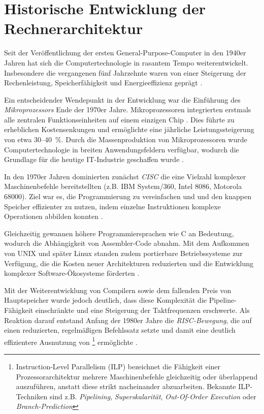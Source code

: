 \section{Historische Entwicklung der Rechnerarchitektur}

Seit der Veröffentlichung der ersten General-Purpose-Computer in den 1940er Jahren hat sich die Computertechnologie in rasantem Tempo weiterentwickelt. Insbesondere die vergangenen fünf Jahrzehnte waren von einer Steigerung der Rechenleistung, Speicherfähigkeit und Energieeffizienz geprägt \parencite[S.~2]{hennessy_computer_2011}.

Ein entscheidender Wendepunkt in der Entwicklung war die Einführung des \textit{Mikroprozessors} Ende der 1970er Jahre. Mikroprozessoren integrierten erstmals alle zentralen Funktionseinheiten auf einem einzigen Chip \parencite[S.~9]{dumas_ii_computer_2006}. Dies führte zu erheblichen Kostensenkungen und ermöglichte eine jährliche Leistungssteigerung von etwa 30–40~\%. Durch die Massenproduktion von Mikroprozessoren wurde Computertechnologie in breiten Anwendungsfeldern verfügbar, wodurch die Grundlage für die heutige IT-Industrie geschaffen wurde \parencites[S.~2]{hennessy_computer_2011}[S.~11]{dumas_ii_computer_2006}.

In den 1970er Jahren dominierten zunächst \textit{\ac{CISC}} die eine Vielzahl komplexer Maschinenbefehle bereitstellten (z.B. IBM System/360, Intel 8086, Motorola 68000). Ziel war es, die Programmierung zu vereinfachen und und den knappen Speicher effizienter zu nutzen, indem einzelne Instruktionen komplexe Operationen abbilden konnten \parencite[S.~12]{dumas_ii_computer_2006}.

Gleichzeitig gewannen höhere Programmiersprachen wie C an Bedeutung, wodurch die Abhängigkeit von Assembler-Code abnahm. Mit dem Aufkommen von UNIX und später Linux standen zudem portierbare Betriebssysteme zur Verfügung, die die Kosten neuer Architekturen reduzierten und die Entwicklung komplexer Software-Ökosysteme förderten \parencites[S.~2]{hennessy_computer_2011}[S.~12]{dumas_ii_computer_2006}.

Mit der Weiterentwicklung von Compilern sowie dem fallenden Preis von Hauptspeicher wurde jedoch deutlich, dass diese Komplexität die Pipeline-Fähigkeit einschränkte und eine Steigerung der Taktfrequenzen erschwerte. Als Reaktion darauf entstand Anfang der 1980er Jahre die \textit{\ac{RISC}-Bewegung}, die auf einen reduzierten, regelmäßigen Befehlssatz setzte und damit eine deutlich effizientere Ausnutzung von \footnote{Instruction-Level Parallelism (ILP) bezeichnet die Fähigkeit einer Prozessorarchitektur mehrere Maschinenbefehle gleichzeitig oder überlappend auszuführen, anstatt diese strikt nacheinander abzuarbeiten. Bekannte ILP-Techniken sind z.B. \textit{Pipelining}, \textit{Superskalarität}, \textit{Out-Of-Order Execution} oder \textit{Branch-Prediction}} ermöglichte \parencite[S.~2]{hennessy_computer_2011}.  


